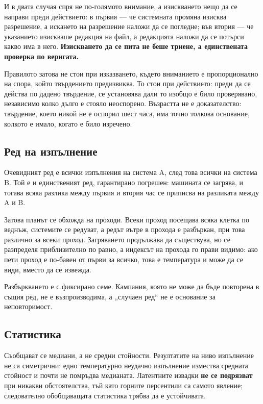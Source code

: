 И в двата случая спря не по-голямото внимание, а изискването нещо да се направи преди действието: в
първия — че системната промяна изисква разрешение, а искането на разрешение наложи да се погледне; във
втория — че указанието изискваше редакция на файл, а редакцията наложи да се потърси какво има в него.
\textbf{Изискването да се пита не беше триене, а единствената проверка по веригата.}

Правилото затова не стои при изказването, където вниманието е пропорционално на спора, който
твърдението предизвиква. То стои при действието: преди да се действа по дадено твърдение, се
установява дали то изобщо е било проверявано, независимо колко дълго е стояло неоспорено. Възрастта не
е доказателство: твърдение, което никой не е оспорил шест часа, има точно толкова основание, колкото е
имало, когато е било изречено.

\subsection{Ред на изпълнение}

Очевидният ред е всички изпълнения на система A, след това всички на система B. Той е и
единственият ред, гарантирано погрешен: машината се загрява, и тогава всяка разлика между
първия и втория час се приписва на разликата между A и B.

Затова планът се обхожда на проходи. Всеки проход посещава всяка клетка по веднъж, системите
се редуват, а редът вътре в прохода е разбъркан, при това различно за всеки проход.
Загряването продължава да съществува, но се разпределя приблизително по равно, а индексът на
прохода го прави видимо: ако пети проход е по-бавен от първи за всичко, това е температура и
може да се види, вместо да се извежда.

Разбъркването е с фиксирано семе. Кампания, която не може да бъде повторена в същия ред, не
е възпроизводима, а „случаен ред“ не е основание за неповторимост.

\subsection{Статистика}

Съобщават се медиани, а не средни стойности. Резултатите на ниво изпълнение не са
симетрични: едно температурно неудачно изпълнение измества средната стойност и почти не
помръдва медианата. Латентните извадки \textbf{не се подрязват} при никакви обстоятелства,
тъй като горните персентили са самото явление; следователно обобщаващата статистика трябва да
е устойчивата.

